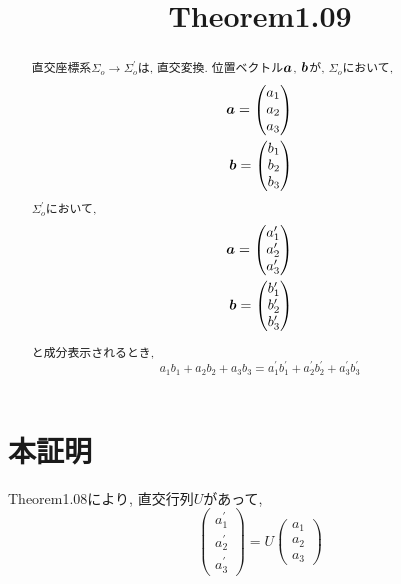 \documentclass{jsarticle}
\title{Theorem1.09}
\newcommand*{\mbold}[1]{\mbox{\boldmath $#1$}}
\begin{document}
\maketitle

\begin{abstract}
  直交座標系$\Sigma_{o} \to \Sigma^\prime_{o}$は, 直交変換.
  位置ベクトル$\mbold{a}$, $\mbold{b}$が, 
  $\Sigma_{o}$において, 
  \begin{eqnarray*}
    \mbold{a}
    =
    \begin{pmatrix}
      a_1 \\
      a_2 \\
      a_3
    \end{pmatrix} \\
    \mbold{b}
    =
    \begin{pmatrix}
      b_1 \\
      b_2 \\
      b_3
    \end{pmatrix} \\
  \end{eqnarray*}
  $\Sigma^\prime_{o}$において, 
  \begin{eqnarray*}
    \mbold{a}
    =
    \begin{pmatrix}
      a^\prime_1 \\
      a^\prime_2 \\
      a^\prime_3
    \end{pmatrix} \\
    \mbold{b}
    =
    \begin{pmatrix}
      b^\prime_1 \\
      b^\prime_2 \\
      b^\prime_3
    \end{pmatrix} \\
  \end{eqnarray*}

  と成分表示されるとき, 
  \begin{equation}
    a_1 b_1 + a_2 b_2 + a_3 b_3 = a^\prime_1 b^\prime_1 + a^\prime_2 b^\prime_2 + a^\prime_3 b^\prime_3
  \end{equation}
\end{abstract}

\section*{本証明}
Theorem1.08により, 直交行列$U$があって, 
\begin{equation}
  \begin{pmatrix}
    a^\prime_1 \\
    a^\prime_2 \\
    a^\prime_3
  \end{pmatrix}
  =
  U
  \begin{pmatrix}
    a_1 \\
    a_2 \\
    a_3
  \end{pmatrix}
\end{equation}
\end{document}
